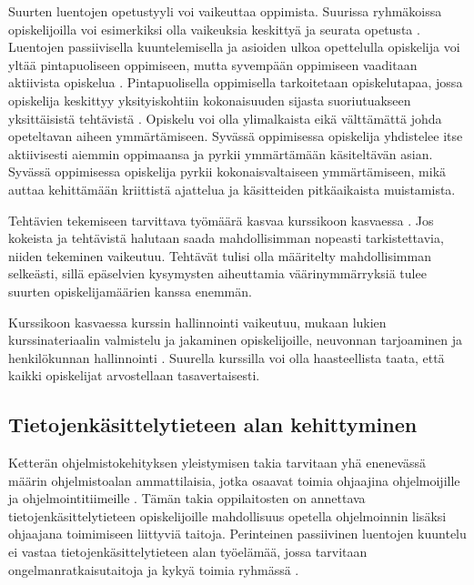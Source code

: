 \documentclass[finnish]{tktltiki2}
\theoremstyle{definition}
\theoremstyle{remark}
\begin{document}
Suurten luentojen opetustyyli voi vaikeuttaa oppimista. Suurissa ryhmäkoissa opiskelijoilla voi esimerkiksi olla vaikeuksia keskittyä ja seurata opetusta \cite{Boyer07}. Luentojen passiivisella kuuntelemisella ja asioiden ulkoa opettelulla opiskelija voi yltää pintapuoliseen oppimiseen, mutta syvempään oppimiseen vaaditaan aktiivista opiskelua \cite{Boyer07}. Pintapuolisella oppimisella tarkoitetaan opiskelutapaa, jossa opiskelija keskittyy yksityiskohtiin kokonaisuuden sijasta suoriutuakseen yksittäisistä tehtävistä \cite{DeepSurfaceLearning}. Opiskelu voi olla ylimalkaista eikä välttämättä johda opeteltavan aiheen ymmärtämiseen. Syvässä oppimisessa opiskelija yhdistelee itse aktiivisesti aiemmin oppimaansa ja pyrkii ymmärtämään käsiteltävän asian. Syvässä oppimisessa opiskelija pyrkii kokonaisvaltaiseen ymmärtämiseen, mikä auttaa kehittämään kriittistä ajattelua ja käsitteiden pitkäaikaista muistamista. \par

Tehtävien tekemiseen tarvittava työmäärä kasvaa kurssikoon kasvaessa \cite{Kay98}. Jos kokeista ja tehtävistä halutaan saada mahdollisimman nopeasti tarkistettavia, niiden tekeminen vaikeutuu. Tehtävät tulisi olla määritelty mahdollisimman selkeästi, sillä epäselvien kysymysten aiheuttamia väärinymmärryksiä tulee suurten opiskelijamäärien kanssa enemmän. \cite{Kay98} \par

Kurssikoon kasvaessa kurssin hallinnointi vaikeutuu, mukaan lukien kurssinateriaalin valmistelu ja jakaminen opiskelijoille, neuvonnan tarjoaminen ja henkilökunnan hallinnointi \cite{Chamillard02}. Suurella kurssilla voi olla haasteellista taata, että kaikki opiskelijat arvostellaan tasavertaisesti. \par



\subsection{Tietojenkäsittelytieteen alan kehittyminen}

Ketterän ohjelmistokehityksen yleistymisen takia tarvitaan yhä enenevässä määrin ohjelmistoalan ammattilaisia, jotka osaavat toimia ohjaajina ohjelmoijille ja ohjelmointitiimeille \cite{Vikberg}. Tämän takia oppilaitosten on annettava tietojenkäsittelytieteen opiskelijoille mahdollisuus opetella ohjelmoinnin lisäksi ohjaajana toimimiseen liittyviä taitoja. Perinteinen passiivinen luentojen kuuntelu ei vastaa tietojenkäsittelytieteen alan työelämää, jossa tarvitaan ongelmanratkaisutaitoja ja kykyä toimia ryhmässä \cite{Vihavainen}. \par
\end{document}
